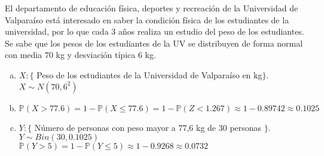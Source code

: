 
\addpoints
\question[20]
El departamento de educación física, deportes y recreación de la Universidad de Valparaíso está interesado en saber la condición física de los estudiantes de la universidad, por lo que cada 3 años realiza un estudio del peso de los estudiantes. Se sabe que los pesos de los estudiantes de la UV se distribuyen de forma normal con media $70$ kg y desviación típica $6$ kg. 
\noaddpoints
{}

\begin{solution}
\begin{enumerate}[a)]
\item $X:\{$ Peso de los estudiantes de la Universidad de Valparaíso en kg$\}$. $X\sim N(70,6^2)$
\item $\mathbb{P}(X>77.6)=1-\mathbb{P}(X\leq 77.6)=1-\mathbb{P}(Z < 1.267)\approx 1-0.89742 \approx 0.1025$ 
\item $Y:\{$ Número de personas con peso mayor a 77,6 kg de 30 personas $\}$. $Y\sim Bin(30,0.1025)$\\
$\mathbb{P}(Y>5)=1-\mathbb{P}(Y\leq 5)\approx 1-0.9268 \approx  0.0732$
\end{enumerate}
\end{solution}
